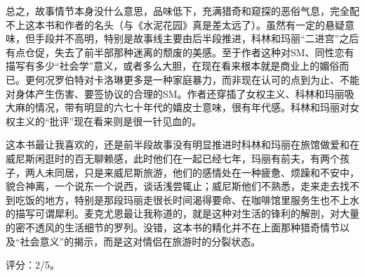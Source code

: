 总之，故事情节本身没什么意思，品味低下，充满猎奇和窥探的恶俗气息，完全配不上这本书和作者的名头（与《水泥花园》真是差太远了）。虽然有一定的悬疑意味，但手段并不高明，特别是故事线主要由后半段推进，科林和玛丽“二进宫”之后有点仓促，失去了前半部那种迷离的颓废的美感。至于作者这种对SM、同性恋有描写有多少“社会学”意义，或者多么大胆，在现在看来根本就是商业上的媚俗而已。更何况罗伯特对卡洛琳更多是一种家庭暴力，而非现在认可的点到为止、不能对身体产生伤害、要签协议的合理的SM。作者还穿插了女权主义、科林和玛丽吸大麻的情况，带有明显的六七十年代的嬉皮士意味，很有年代感。科林和玛丽对女权主义的“批评”现在看来则是很一针见血的。

这本书最让我喜欢的，还是前半段故事没有明显推进时科林和玛丽在旅馆做爱和在威尼斯闲逛时的百无聊赖感，此时他们在一起已经七年，玛丽有前夫，有两个孩子，两人未同居，只是来威尼斯旅游，他们的感情处在一种疲惫、烦躁和不安中，貌合神离，一个说东一个说西，谈话浅尝辄止；威尼斯他们不熟悉，走来走去找不到吃饭的地方，特别是那段玛丽走很长时间渴得要命、在咖啡馆里服务生也不上水的描写可谓犀利。麦克尤恩最让我称道的，就是这种对生活的锋利的解剖，对大量的密不透风的生活细节的罗列。没错，这本书的精化并不在上面那种猎奇情节以及“社会意义”的揭示，而是这对情侣在旅游时的分裂状态。

评分：2/5。
